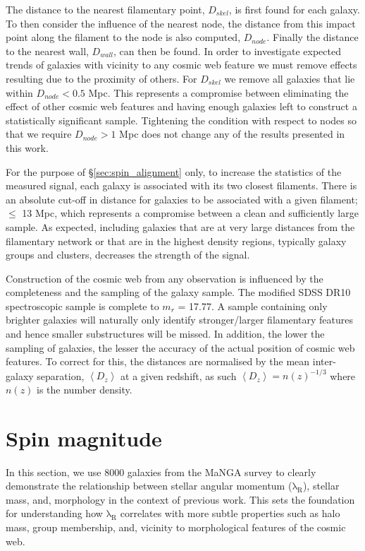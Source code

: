 The distance to the nearest filamentary point, $D_{skel}$, is first found for each galaxy. To then consider the influence of the nearest node, the distance from this impact point along the filament to the node is also computed, $D_{node}$. Finally the distance to the nearest wall, $D_{wall}$, can then be found. In order to investigate expected trends of galaxies with vicinity to any cosmic web feature we must remove effects resulting due to the proximity of others. For $D_{skel}$ we remove all galaxies that lie within $D_{node} < 0.5$ Mpc. This represents a compromise between eliminating the effect of other cosmic web features and having enough galaxies left to construct a statistically significant sample. Tightening the condition with respect to nodes so that we require $D_{node} > 1$ Mpc does not change any of the results presented in this work. 

For the purpose of \S\ref{sec:spin_alignment} only, to increase the statistics of the measured signal, each galaxy is associated with its two closest filaments. There is an absolute cut-off in distance for galaxies to be associated with a given filament; $\leq$ 13 Mpc, which represents a compromise between a clean and sufficiently large sample. As expected, including galaxies that are at very large distances from the filamentary network or that are in the highest density regions, typically galaxy groups and clusters, decreases the strength of the signal.

Construction of the cosmic web from any observation is influenced by the completeness and the sampling of the galaxy sample. The modified SDSS DR10 spectroscopic sample is complete to $m_r$ = 17.77. A sample containing only brighter galaxies will naturally only identify stronger/larger filamentary features and hence smaller substructures will be missed. In addition, the lower the sampling of galaxies, the lesser the accuracy of the actual position of cosmic web features. To correct for this, the distances are normalised by the mean inter-galaxy separation, $\left\langle D_z \right\rangle$ at a given redshift, as such $\left\langle D_z \right\rangle = n(z)^{-1/3}$ where $n(z)$ is the number density. 

\section{Spin magnitude} \label{sec:spin_magnitude}
In this section, we use 8000 galaxies from the MaNGA survey to clearly demonstrate the relationship between stellar angular momentum ($\mathrm{\lambda_R}$), stellar mass, and, morphology in the context of previous work. This sets the foundation for understanding how $\mathrm{\lambda_R}$ correlates with more subtle properties such as halo mass, group membership, and, vicinity to morphological features of the cosmic web.


